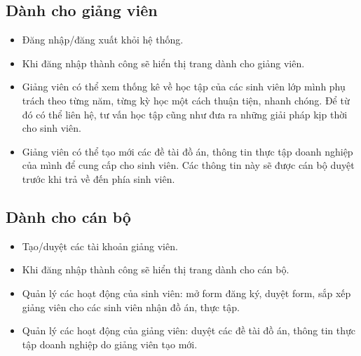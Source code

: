 \subsection{Dành cho giảng viên}
\begin{itemize}
	\item Đăng nhập/đăng xuất khỏi hệ thống.
	\item Khi đăng nhập thành công sẽ hiển thị trang dành cho giảng viên.
	\item Giảng viên có thể xem thống kê về học tập của các sinh viên lớp mình phụ trách theo từng năm, từng kỳ học một cách thuận tiện, nhanh chóng. Để từ đó có thể liên hệ, tư vấn học tập cũng như đưa ra những giải pháp kịp thời cho sinh viên.
	\item Giảng viên có thể tạo mới các đề tài đồ án, thông tin thực tập doanh nghiệp của mình để cung cấp cho sinh viên. Các thông tin này sẽ được cán bộ duyệt trước khi trả về đến phía sinh viên.
\end{itemize}
\subsection{Dành cho cán bộ}
\begin{itemize}
	\item Tạo/duyệt các tài khoản giảng viên.
	\item Khi đăng nhập thành công sẽ hiển thị trang dành cho cán bộ.
	\item Quản lý các hoạt động của sinh viên: mở form đăng ký, duyệt form, sắp xếp giảng viên cho các sinh viên nhận đồ án, thực tập.
	\item Quản lý các hoạt động của giảng viên: duyệt các đề tài đồ án, thông tin thực tập doanh nghiệp do giảng viên tạo mới.
\end{itemize}